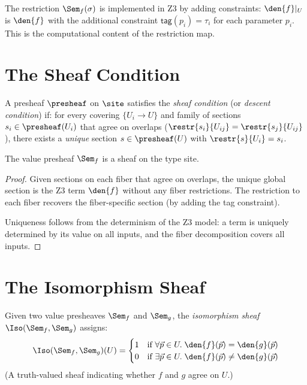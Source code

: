 \begin{remark}
The restriction $\Sem_f(\sigma)$ is implemented in Z3 by adding
constraints: $\den{f}|_U$ is $\den{f}$ with the additional constraint
$\mathsf{tag}(p_i) = \tau_i$ for each parameter $p_i$.  This is
the computational content of the restriction map.
\end{remark}

\section{The Sheaf Condition}

\begin{definition}
A presheaf $\presheaf$ on $\site$ satisfies the \emph{sheaf condition}
(or \emph{descent condition}) if: for every covering
$\{U_i \to U\}$ and family of sections $s_i \in \presheaf(U_i)$
that agree on overlaps ($\restr{s_i}{U_{ij}} = \restr{s_j}{U_{ij}}$),
there exists a \emph{unique} section $s \in \presheaf(U)$ with
$\restr{s}{U_i} = s_i$.
\end{definition}

\begin{proposition}
The value presheaf $\Sem_f$ is a sheaf on the type site.
\end{proposition}

\begin{proof}
Given sections on each fiber that agree on overlaps, the unique
global section is the Z3 term $\den{f}$ without any fiber restrictions.
The restriction to each fiber recovers the fiber-specific section
(by adding the tag constraint).

Uniqueness follows from the determinism of the Z3 model: a term
is uniquely determined by its value on all inputs, and the fiber
decomposition covers all inputs.
\end{proof}

\section{The Isomorphism Sheaf}

\begin{definition}
\label{def:iso-sheaf}
Given two value presheaves $\Sem_f$ and $\Sem_g$, the
\emph{isomorphism sheaf} $\Iso(\Sem_f, \Sem_g)$ assigns:
\[
  \Iso(\Sem_f, \Sem_g)(U) = \begin{cases}
    1 & \text{if } \forall \vec{p} \in U.\;
      \den{f}(\vec{p}) = \den{g}(\vec{p}) \\
    0 & \text{if } \exists \vec{p} \in U.\;
      \den{f}(\vec{p}) \neq \den{g}(\vec{p})
  \end{cases}
\]
(A truth-valued sheaf indicating whether $f$ and $g$ agree on $U$.)
\end{definition}

